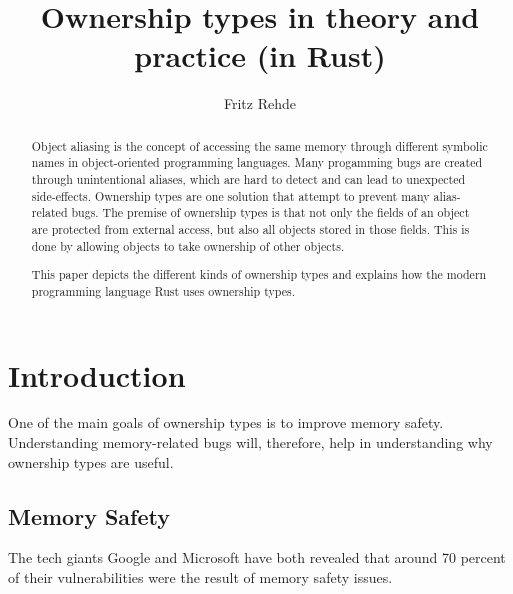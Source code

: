 \documentclass[sigplan,11pt,nonacm]{acmart}
\begin{document}
\title{Ownership types in theory and practice (in Rust)}
\author{Fritz Rehde}

\begin{abstract}


Object aliasing is the concept of accessing the same memory through different symbolic names in object-oriented programming languages.
Many progamming bugs are created through unintentional aliases, which are hard to detect and can lead to unexpected side-effects.
Ownership types are one solution that attempt to prevent many alias-related bugs.
The premise of ownership types is that not only the fields of an object are protected from external access, but also all objects stored in those fields.
This is done by allowing objects to take ownership of other objects.

This paper depicts the different kinds of ownership types and explains how the modern programming language Rust uses ownership types.

\end{abstract}


\maketitle

\section{Introduction}
\label{sec:introduction}

One of the main goals of ownership types is to improve memory safety.
Understanding memory-related bugs will, therefore, help in understanding why ownership types are useful.


\subsection{Memory Safety}

The tech giants Google \cite{google-memory-safety} and Microsoft \cite{microsoft-memory-safety} have both revealed that around 70 percent of their vulnerabilities were the result of memory safety issues.
\end{document}
